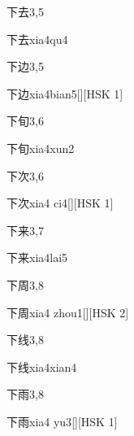 \begin{entry}{下去}{3,5}
  \begin{phonetics}{下去}{xia4qu4}
  \end{phonetics}
\end{entry}

\begin{entry}{下边}{3,5}
  \begin{phonetics}{下边}{xia4bian5}[][HSK 1]
  \end{phonetics}
\end{entry}

\begin{entry}{下旬}{3,6}
  \begin{phonetics}{下旬}{xia4xun2}
  \end{phonetics}
\end{entry}

\begin{entry}{下次}{3,6}
  \begin{phonetics}{下次}{xia4 ci4}[][HSK 1]
  \end{phonetics}
\end{entry}

\begin{entry}{下来}{3,7}
  \begin{phonetics}{下来}{xia4lai5}
  \end{phonetics}
\end{entry}

\begin{entry}{下周}{3,8}
  \begin{phonetics}{下周}{xia4 zhou1}[][HSK 2]
  \end{phonetics}
\end{entry}

\begin{entry}{下线}{3,8}
  \begin{phonetics}{下线}{xia4xian4}
  \end{phonetics}
\end{entry}

\begin{entry}{下雨}{3,8}
  \begin{phonetics}{下雨}{xia4 yu3}[][HSK 1]
  \end{phonetics}
\end{entry}

